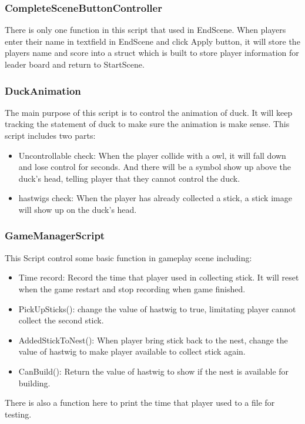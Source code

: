 \documentclass[12pt]{article}
\begin{document}
\subsubsection{CompleteSceneButtonController}
There is only one function in this script that used in EndScene. When players enter their name in textfield in EndScene and click Apply button, it will store the players name and score into a struct which is built to store player information for leader board and return to StartScene. 

\subsubsection{DuckAnimation}
The main purpose of this script is to control the animation of duck. It will keep tracking the statement of duck to make sure the animation is make sense. This script includes two parts:
\begin{itemize}
\item Uncontrollable check: When the player collide with a owl, it will fall down and lose control for seconds. And there will be a symbol show up above the duck's head, telling player that they cannot control the duck.
\item hastwigs check: When the player has already collected a stick, a stick image will show up on the duck's head.
\end{itemize}

\subsubsection{GameManagerScript}
This Script control some basic function in gameplay scene including:
\begin{itemize}
\item Time record: Record the time that player used in collecting stick. It will reset when the game restart and stop recording when game finished.
\item PickUpSticks(): change the value of hastwig to true, limitating player cannot collect the second stick.
\item AddedStickToNest(): When player bring stick back to the nest, change the value of hastwig to make player available to collect stick again.
\item CanBuild(): Return the value of hastwig to show if the nest is available for building.
\end{itemize}
There is also a function here to print the time that player used to a file for testing.
\end{document}
